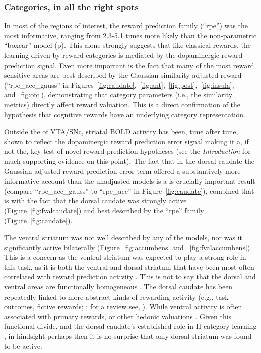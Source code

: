 \subsubsection{Categories, in all the right spots}
\label{subsub:rightspots}
In most of the regions of interest, the reward prediction family (``rpe'') was the most informative, ranging from 2.3-5.1 times more likely than the non-parametric ``boxcar'' model (p\pageref{subsub:belowctx}).  This alone strongly suggests that like classical rewards, the learning driven by reward categories is mediated by the dopaminergic reward prediction signal.  Even more important is the fact that many of the most reward sensitive areas are best described by the Gaussian-similarity adjusted reward (``rpe\_acc\_gauss'' in Figures~\ref{fig:caudate},~\ref{fig:ant},~\ref{fig:post},~\ref{fig:insula}, and~\ref{fig:ofc}), demonstrating that category parameters (i.e., the similarity metrics) directly affect reward valuation.  This is a direct confirmation of the hypothesis that cognitive rewards have an underlying category representation.

Outside the of VTA/SNc, striatal BOLD activity has been, time after time, shown to reflect the dopaminergic reward prediction error signal making it a, if not the, key test of novel reward prediction hypotheses (see the \emph{Introduction} for much supporting evidence on this point).  The fact that in the dorsal caudate the Gaussian-adjusted reward prediction error term offered a substantively more informative account than the unadjusted models is a is crucially important result (compare ``rpe\_acc\_gauss'' to ``rpe\_acc'' in Figure~\ref{fig:caudate}), combined that is with the fact that the dorsal caudate was strongly active (Figure~\ref{fig:fvalcaudate}) and best described by the ``rpe'' family (Figure~\ref{fig:caudate}).  
 
The ventral striatum was not well described by any of the models, nor was it significantly active bilaterally (Figure~\ref{fig:accumbens} and ~\ref{fig:fvalaccumbens}).  This is a concern as the ventral striatum was expected to play a strong role in this task, as it is both the ventral and dorsal striatum that have been most often correlated with reward prediction activity \cite{ODoherty:2003p6329,Knutson:2007p1687,Schonberg:2007p518}.  This is not to say that the dorsal and ventral areas are functionally homogeneous \cite{Schonberg:2009p6669,ODoherty:2004p1269,Atallah:2007p1746}.  The dorsal caudate has been repeatedly linked to more abstract kinds of rewarding activity (e.g., task outcomes, fictive rewards; ; for a review see, ).  While ventral activity is  often associated with primary rewards, or other hedonic valuations \cite{ODoherty:2004p1269}.  Given this functional divide, and the dorsal caudate's established role in II category learning \cite{Ashby:1998p9716}, in hindsight perhaps then it is no surprise that only dorsal striatum was found to be active.

